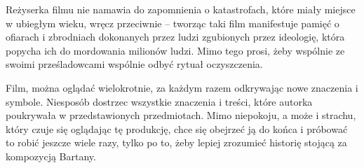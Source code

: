 \documentclass[14pt]{extarticle}
\begin{document}
Reżyserka filmu nie namawia do zapomnienia o katastrofach, które miały miejsce w ubiegłym wieku, wręcz przeciwnie -- tworząc taki film manifestuje pamięć o ofiarach i zbrodniach dokonanych przez ludzi zgubionych przez ideologię, która popycha ich do mordowania milionów ludzi. Mimo tego prosi, żeby wspólnie ze swoimi prześladowcami wspólnie odbyć rytuał oczyszczenia.

Film, można oglądać wielokrotnie, za każdym razem odkrywając nowe znaczenia i symbole. Niesposób dostrzec wszystkie znaczenia i treści, które autorka poukrywała w przedstawionych przedmiotach. Mimo niepokoju, a może i strachu, który czuje się oglądając tę produkcję, chce się obejrzeć ją do końca i próbować to robić jeszcze wiele razy, tylko po to, żeby lepiej zrozumieć historię stojącą za kompozycją Bartany. 



\end{document}
